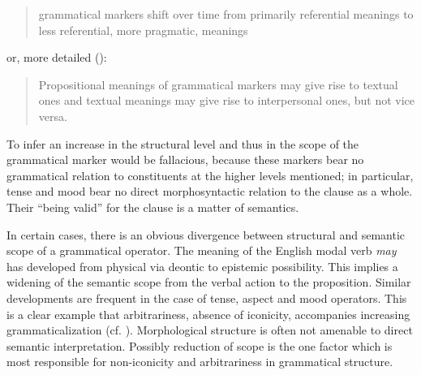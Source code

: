 \begin{quote}
grammatical markers shift over time from primarily referential meanings to less referential, more pragmatic, meanings
\end{quote}

\noindent or, more detailed (\citeyear[47]{Traugott1980}):

\begin{quote}
Propositional meanings of grammatical markers may give rise to textual ones and textual meanings may give rise to interpersonal ones, but not vice versa.
\end{quote}

\noindent To infer an increase in the structural level and thus in the scope of the grammatical marker would be fallacious, because these markers bear no grammatical relation to constituents at the higher levels mentioned; in particular, tense and mood bear no direct morphosyntactic relation to the clause as a whole. Their “being valid” for the clause is a matter of semantics.

In certain cases, there is an obvious divergence between structural and semantic scope of a grammatical operator. The meaning of the English modal verb \textit{may} has developed from physical via deontic to epistemic possibility. This implies a widening of the semantic scope from the verbal action to the proposition. Similar developments are frequent in the case of tense, aspect and mood operators. This is a clear example that arbitrariness, absence of iconicity, accompanies increasing grammaticalization (cf. ). Morphological structure is often not amenable to direct semantic interpretation. Possibly reduction of scope is the one factor which is most responsible for non-iconicity and arbitrariness in grammatical structure.

